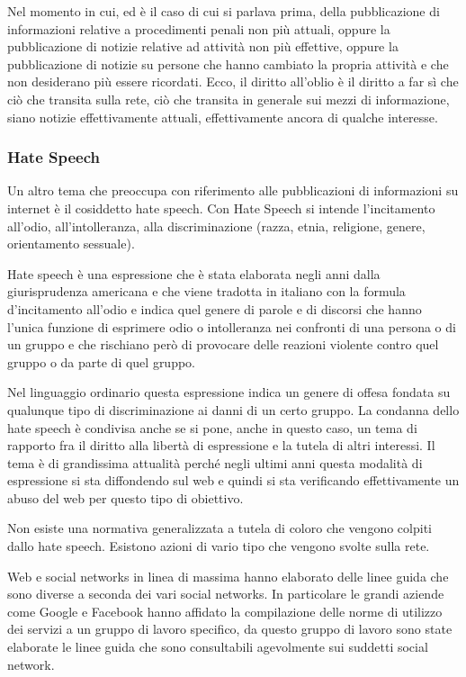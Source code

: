 Nel momento in cui, ed è il caso di cui si parlava prima, della pubblicazione di informazioni relative a procedimenti penali non più attuali, oppure la pubblicazione di notizie relative ad attività non più effettive, oppure la pubblicazione di notizie su persone che hanno cambiato la propria attività e che non desiderano più essere ricordati. Ecco, il diritto all'oblio è il diritto a far sì che ciò che transita sulla rete, ciò che transita in generale sui mezzi di informazione, siano notizie effettivamente attuali, effettivamente ancora di qualche interesse.

\subsubsection{Hate Speech}

Un altro tema che preoccupa con riferimento alle pubblicazioni di informazioni su internet è il cosiddetto hate speech.
Con Hate Speech si intende l'incitamento all'odio, all'intolleranza, alla discriminazione (razza, etnia, religione, genere, orientamento sessuale).

Hate speech è una espressione che è stata elaborata negli anni dalla giurisprudenza americana e che viene tradotta in italiano con la formula d'incitamento all'odio e indica quel genere di parole e di discorsi che hanno l'unica funzione di esprimere odio o intolleranza nei confronti di una persona o di un gruppo e che rischiano però di provocare delle reazioni violente contro quel gruppo o da parte di quel gruppo.

Nel linguaggio ordinario questa espressione indica un genere di offesa fondata su qualunque tipo di discriminazione ai danni di un certo gruppo. La condanna dello hate speech è condivisa anche se si pone, anche in questo caso, un tema di rapporto fra il diritto alla libertà di espressione e la tutela di altri interessi. Il tema è di grandissima attualità perché negli ultimi anni questa modalità di espressione si sta diffondendo sul web e quindi si sta verificando effettivamente un abuso del web per questo tipo di obiettivo.

Non esiste una normativa generalizzata a tutela di coloro che vengono colpiti dallo hate speech. Esistono azioni di vario tipo che vengono svolte sulla rete. 

Web e social networks in linea di massima hanno elaborato delle linee guida che sono diverse a seconda dei vari social networks. In particolare le grandi aziende come Google e Facebook hanno affidato la compilazione delle norme di utilizzo dei servizi a un gruppo di lavoro specifico, da questo gruppo di lavoro sono state elaborate le linee guida che sono consultabili agevolmente sui suddetti social network.

